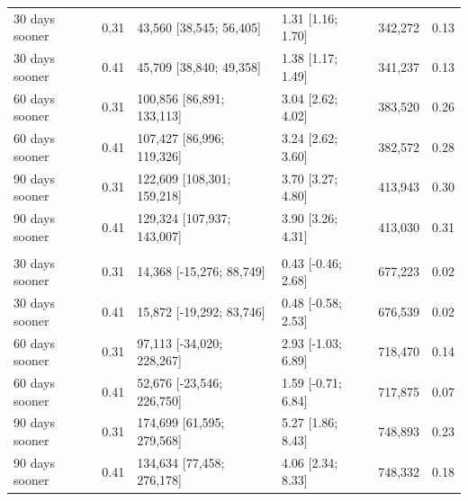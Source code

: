 \documentclass{article}
\begin{document}
\begin{table}
\begin{tabular}[t]{lrlllr}
\hspace{1em}30 days sooner & 0.31 & 43,560 [38,545; 56,405] & 1.31 [1.16; 1.70] & 342,272 & 0.13\\
\hspace{1em}30 days sooner & 0.41 & 45,709 [38,840; 49,358] & 1.38 [1.17; 1.49] & 341,237 & 0.13\\
\hspace{1em}60 days sooner & 0.31 & 100,856 [86,891; 133,113] & 3.04 [2.62; 4.02] & 383,520 & 0.26\\
\hspace{1em}60 days sooner & 0.41 & 107,427 [86,996; 119,326] & 3.24 [2.62; 3.60] & 382,572 & 0.28\\
\hspace{1em}90 days sooner & 0.31 & 122,609 [108,301; 159,218] & 3.70 [3.27; 4.80] & 413,943 & 0.30\\
\hspace{1em}90 days sooner & 0.41 & 129,324 [107,937; 143,007] & 3.90 [3.26; 4.31] & 413,030 & 0.31\\
\addlinespace[0.3em]
\multicolumn{6}{l}{\textbf{US to Jan 2022}}\\
\hspace{1em}30 days sooner & 0.31 & 14,368 [-15,276; 88,749] & 0.43 [-0.46; 2.68] & 677,223 & 0.02\\
\hspace{1em}30 days sooner & 0.41 & 15,872 [-19,292; 83,746] & 0.48 [-0.58; 2.53] & 676,539 & 0.02\\
\hspace{1em}60 days sooner & 0.31 & 97,113 [-34,020; 228,267] & 2.93 [-1.03; 6.89] & 718,470 & 0.14\\
\hspace{1em}60 days sooner & 0.41 & 52,676 [-23,546; 226,750] & 1.59 [-0.71; 6.84] & 717,875 & 0.07\\
\hspace{1em}90 days sooner & 0.31 & 174,699 [61,595; 279,568] & 5.27 [1.86; 8.43] & 748,893 & 0.23\\
\hspace{1em}90 days sooner & 0.41 & 134,634 [77,458; 276,178] & 4.06 [2.34; 8.33] & 748,332 & 0.18\\
\bottomrule
\end{tabular}
\end{table}
\end{document}
